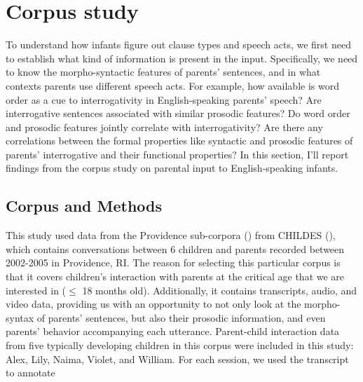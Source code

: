 







\section{Corpus study}
\label{sec:engcl:corpus}
To understand how infants figure out clause types and speech acts, we first need to establish what kind of information is present in the input. Specifically, we need to know the morpho-syntactic features of parents’ sentences, and in what contexts parents use different speech acts. For example, how available is word order as a cue to interrogativity in English-speaking parents’ speech? Are interrogative sentences associated with similar prosodic features? Do word order and prosodic features jointly correlate with interrogativity? Are there any correlations between the formal properties like syntactic and prosodic features of parents’ interrogative and their functional properties? In this section, I’ll report findings from the corpus study on parental input to English-speaking infants. 


\subsection{Corpus and Methods}
\label{sec:engcl:corpus:methods}

This study used data from the Providence sub-corpora (\cite{ProvidenceCorpus}) from CHILDES (\cite{CHILDES}), which contains conversations between 6 children and parents recorded between 2002-2005 in Providence, RI. The reason for selecting this particular corpus is that it covers children’s interaction with parents at the critical age that we are interested in ($\leq$ 18 months old). Additionally, it contains transcripts, audio, and video data, providing us with an opportunity to not only look at the morpho-syntax of parents’ sentences, but also their prosodic information, and even parents’ behavior accompanying each utterance. Parent-child interaction data from five typically developing children in this corpus were included in this study: Alex, Lily, Naima, Violet, and William. For each session, we used the transcript to annotate  

